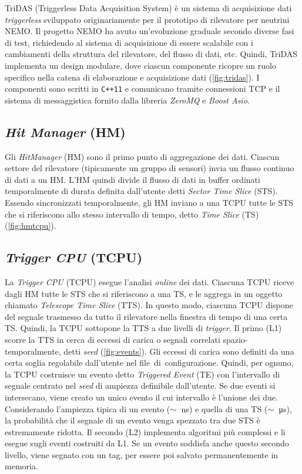 \documentclass[../main.tex]{subfiles}
\begin{document}
TriDAS (Triggerless Data Acquisition System) è un sistema di acquisizione dati \emph{triggerless} sviluppato originariamente per il prototipo di rilevatore per neutrini \mbox{NEMO}.
Il progetto NEMO ha avuto un'evoluzione graduale secondo diverse fasi di test, richiedendo al sistema di acquisizione di essere scalabile con i cambiamenti della struttura del rilevatore, del flusso di dati, etc.
Quindi, TriDAS implementa un design modulare, dove ciascun componente ricopre un ruolo specifico nella catena di elaborazione e acquisizione dati (\autoref{fig:tridas}).
I componenti sono scritti in \texttt{C++11} e comunicano tramite connessioni TCP e il sistema di messaggistica fornito dalla libreria \emph{ZeroMQ} e \emph{Boost Asio}.

\subsection{\emph{Hit Manager} (HM)}
Gli \emph{HitManager} (HM) sono il primo punto di aggregazione dei dati. 
Ciascun settore del rilevatore (tipicamente un gruppo di sensori) invia un flusso continuo di dati a un HM. L'HM quindi divide il flusso di dati in buffer ordinati temporalmente di durata definita dall'utente detti \emph{Sector Time Slice} (STS). Essendo sincronizzati temporalmente, gli HM inviano a una TCPU tutte le STS che si riferiscono allo stesso intervallo di tempo, detto \emph{Time Slice} (TS) (\autoref{fig:hmtcpu}). 

\subsection{\emph{Trigger CPU} (TCPU)}
La \emph{Trigger CPU} (TCPU) esegue l'analisi \emph{online} dei dati.
Ciascuna TCPU riceve dagli HM tutte le STS che si riferiscono a una TS, e le aggrega in un oggetto chiamato \emph{Telescope Time Slice} (TTS). In questo modo, ciascuna TCPU dispone del segnale trasmesso da tutto il rilevatore nella finestra di tempo di una certa TS. Quindi, la TCPU sottopone la TTS a due livelli di \emph{trigger}.
Il primo (L1) scorre la TTS in cerca di eccessi di carica o segnali correlati spazio-temporalmente, detti \emph{seed} (\autoref{fig:events}). Gli eccessi di carica sono definiti da una certa soglia regolabile dall'utente nel \mbox{file di configurazione}. Quindi, per ognuno, la TCPU costruisce un evento detto \emph{Triggered Event} (TE) con l'intervallo di segnale centrato nel \emph{seed} di ampiezza definibile dall'utente. 
Se due eventi si intersecano, viene creato un unico evento il cui intervallo è l'unione dei due.
Considerando l'ampiezza tipica di un evento ({$\small \sim$}\SI{}{\ns}) e quella di una TS ({$\small \sim$}\SI{}{\micro \s}), la probabilità che il segnale di un evento venga spezzato tra due STS è estremamente ridotta. 
Il secondo (L2) implementa algoritmi più complessi e li esegue sugli eventi costruiti da L1. Se un evento soddisfa anche questo secondo livello, viene segnato con un tag, per essere poi salvato permanentemente in memoria.
\end{document}
